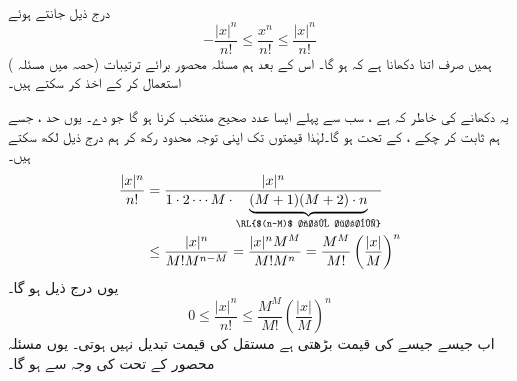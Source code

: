 \\
درج ذیل جانتے ہوئے
\[-\frac{|x|^n}{n!}\le \frac{x^n}{n!}\le \frac{|x|^n}{n!}\]
ہمیں صرف اتنا دکھانا ہے کہ  ہو گا۔ اس کے بعد ہم   مسئلہ محصور برائے  ترتیبات    (حصہ  میں    مسئلہ  )  استعمال کر کے   اخذ کر سکتے ہیں۔

یہ دکھانے کی خاطر کہ  ہے ، سب سے پہلے  ایسا عدد صحیح   منتخب کرنا ہو گا   جو  دے۔  یوں حد  ،   جسے  ہم ثابت کر چکے ، کے تحت  ہو گا۔لہٰذا    قیمتوں تک اپنی توجہ محدود رکھ کر ہم   درج ذیل لکھ سکتے ہیں۔
\begin{align*}
\frac{|x|^n}{n!}&=\frac{|x|^n}{1\cdot 2\cdots M\cdot \underbrace{(M+1)(M+2)\cdot n}_{\text{\RL{$(n-M)$ جزو ضربی}}}}\\
&\le \frac{|x|^n}{M!M^{n-M}}=\frac{|x|^n M^M}{M!M^n}=\frac{M^M}{M!}\left(\frac{|x|}{M}\right)^n
\end{align*}
یوں درج ذیل ہو گا۔
\[0\le \frac{|x|^n}{n!}\le \frac{M^M}{M!}\left(\frac{|x|}{M}\right)^n\]
اب جیسے جیسے  کی قیمت بڑھتی ہے مستقل  کی قیمت تبدیل نہیں ہوتی۔ یوں مسئلہ محصور کے تحت  کی وجہ سے  ہو گا۔
